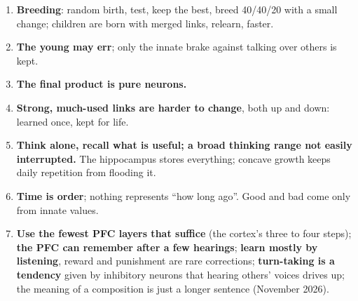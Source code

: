 \documentclass[11pt]{article}
\begin{document}
\begin{enumerate}
it is innately good to people. An instinct is a hard-to-change, broad connection from broad features to broad tendencies;
values are stable, choices are free; ``do not hurt'' is stronger than ``help''; a society of diverse individuals is stable
even if no single one can be guaranteed.
\item \textbf{Breeding}: random birth, test, keep the best, breed 40/40/20 with a small change; children are born with
merged links, relearn, faster.
\item \textbf{The young may err}; only the innate brake against talking over others is kept.
\item \textbf{The final product is pure neurons.}
\item \textbf{Strong, much-used links are harder to change}, both up and down: learned once, kept for life.
\item \textbf{Think alone, recall what is useful; a broad thinking range not easily interrupted.} The hippocampus stores
everything; concave growth keeps daily repetition from flooding it.
\item \textbf{Time is order}; nothing represents ``how long ago''. Good and bad come only from innate values.
\item \textbf{Use the fewest PFC layers that suffice} (the cortex's three to four steps); \textbf{the PFC can remember after
a few hearings}; \textbf{learn mostly by listening}, reward and punishment are rare corrections; \textbf{turn-taking is a
tendency} given by inhibitory neurons that hearing others' voices drives up; the meaning of a composition is just a longer
sentence (November 2026).
\end{enumerate}
\end{document}
